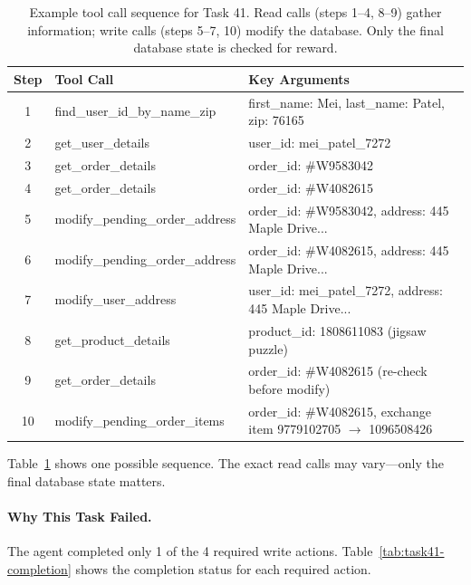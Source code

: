 \begin{table}[h]
\centering
\small
\begin{tabular}{clp{7cm}}
\toprule
\textbf{Step} & \textbf{Tool Call} & \textbf{Key Arguments} \\
\midrule
1 & find\_user\_id\_by\_name\_zip & first\_name: Mei, last\_name: Patel, zip: 76165 \\
2 & get\_user\_details & user\_id: mei\_patel\_7272 \\
3 & get\_order\_details & order\_id: \#W9583042 \\
4 & get\_order\_details & order\_id: \#W4082615 \\
5 & modify\_pending\_order\_address & order\_id: \#W9583042, address: 445 Maple Drive... \\
6 & modify\_pending\_order\_address & order\_id: \#W4082615, address: 445 Maple Drive... \\
7 & modify\_user\_address & user\_id: mei\_patel\_7272, address: 445 Maple Drive... \\
8 & get\_product\_details & product\_id: 1808611083 (jigsaw puzzle) \\
9 & get\_order\_details & order\_id: \#W4082615 (re-check before modify) \\
10 & modify\_pending\_order\_items & order\_id: \#W4082615, exchange item 9779102705 $\rightarrow$ 1096508426 \\
\bottomrule
\end{tabular}
\caption{Example tool call sequence for Task 41. Read calls (steps 1--4, 8--9) gather information; write calls (steps 5--7, 10) modify the database. Only the final database state is checked for reward.}
\label{tab:task41-eval}
\end{table}

Table~\ref{tab:task41-eval} shows one possible sequence. The exact read calls may vary---only the final database state matters.

\paragraph{Why This Task Failed.} The agent completed only 1 of the 4 required write actions. Table~\ref{tab:task41-completion} shows the completion status for each required action.

